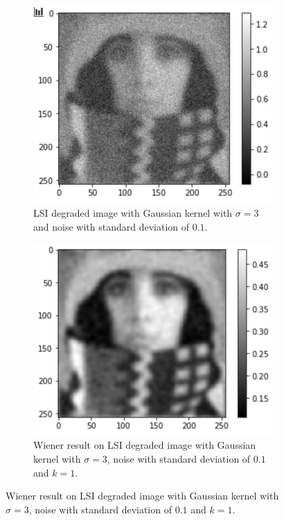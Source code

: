 \begin{figure}[H]
\begin{subfigure}[b]{0.45\linewidth}
	\end{subfigure}
	\\
	\begin{subfigure}[b]{0.45\linewidth}
		\centering
		\includegraphics[width=\linewidth]{Materials/E5/w6before}
		\caption{LSI degraded image with Gaussian kernel with $\sigma = 3$ and noise with standard deviation of $0.1$.}
	\end{subfigure}
	\hfill
	\begin{subfigure}[b]{0.45\linewidth}
		\centering
		\includegraphics[width=\linewidth]{Materials/E5/w6after}
		\caption{Wiener result on LSI degraded image with Gaussian kernel with $\sigma = 3$, noise with standard deviation of $0.1$ and $k = 1$.}

\end{subfigure}
\end{figure}
